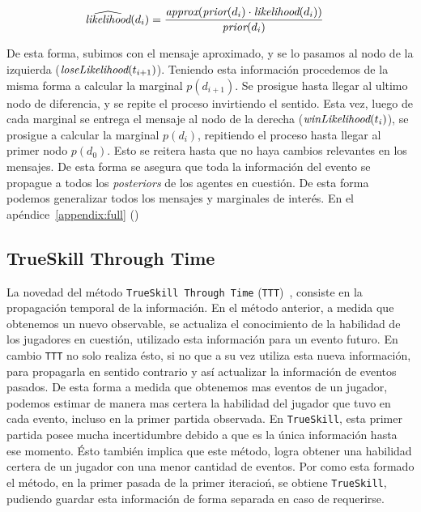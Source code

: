 \documentclass[11pt,twoside,spanish]{report} %
\begin{document}
\begin{equation}
\begin{split}
\widehat{\emph{likelihood}}(d_i) &= \frac{\emph{approx}(\emph{prior}(d_i) \cdot \emph{likelihood}(d_i))}{ \emph{prior}(d_i)}
\end{split}
\end{equation}


De esta forma, subimos con el mensaje aproximado, y se lo pasamos al nodo de la izquierda ($\emph{loseLikelihood}(t_{i+1})$).
Teniendo esta informaci\'on procedemos de la misma forma a calcular la marginal $p(d_{i+1})$.
Se prosigue hasta llegar al ultimo nodo de diferencia, y se repite el proceso invirtiendo el sentido.
Esta vez, luego de cada marginal se entrega el mensaje al nodo de la derecha ($\emph{winLikelihood}(t_{i})$), se prosigue a calcular la marginal $p(d_{i})$, repitiendo el proceso hasta llegar al primer nodo $p(d_{0})$.
Esto se reitera hasta que no haya cambios relevantes en los mensajes.
De esta forma se asegura que toda la informaci\'on del evento se propague a todos los \textit{posteriors} de los agentes en cuesti\'on.
De esta forma podemos generalizar todos los mensajes y marginales de inter\'es.
En el ap\'endice~\ref{appendix:full} ()





\subsection{TrueSkill Through Time}


La novedad del m\'etodo  \texttt{TrueSkill Through Time} (\texttt{TTT})~\cite{Dangauthier2007}, consiste en la propagaci\'on temporal de la informaci\'on.
En el m\'etodo anterior, a medida que obtenemos un nuevo observable, se actualiza el conocimiento de la habilidad de los jugadores en cuesti\'on, utilizado esta informaci\'on para un evento futuro.
En cambio \texttt{TTT} no solo realiza \'esto, si no que a su vez utiliza esta nueva informaci\'on, para propagarla en sentido contrario y as\'i actualizar la informaci\'on de eventos pasados.
De esta forma a medida que obtenemos mas eventos de un jugador, podemos estimar de manera mas certera la habilidad del jugador  que tuvo en cada evento, incluso en la primer partida observada.
En \texttt{TrueSkill}, esta primer partida posee mucha incertidumbre debido a que es la \'unica informaci\'on hasta ese momento.
\'Esto tambi\'en implica que este m\'etodo, logra  obtener una habilidad certera de un jugador con una menor cantidad de eventos.
Por como esta formado el m\'etodo, en la primer pasada de la primer iteracio\'n, se obtiene \texttt{TrueSkill}, pudiendo guardar esta informaci\'on de forma separada en caso de requerirse.
\end{document}
